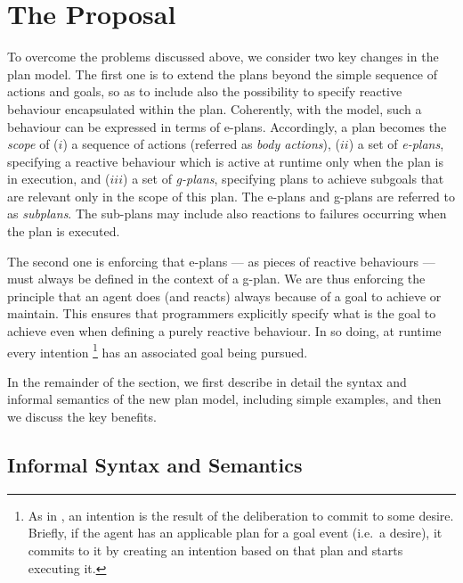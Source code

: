 \section{The {\aser} Proposal}
\label{sec:proposal}

To overcome the problems discussed above, we consider two key changes
in the plan model.
%
The first one is to extend the plans beyond the simple sequence of
actions and goals, so as to include also the possibility to specify
reactive behaviour encapsulated within the plan.
%
Coherently, with the {\asl} model, such a behaviour can be expressed
in terms of e-plans.
%
Accordingly, a plan becomes the \emph{scope} of ($i$) a sequence of
actions (referred as \emph{body actions}), ($ii$) a set of
\emph{e-plans}, specifying a reactive behaviour which is active at
runtime only when the plan is in execution, and ($iii$) a set of
\emph{g-plans}, specifying plans to achieve subgoals that are relevant
only in the scope of this plan. The e-plans and g-plans are referred
to as \emph{subplans}.
%
The sub-plans may include also reactions to failures occurring when
the plan is executed.

%
%
%
The second one is enforcing that e-plans --- as pieces of reactive
behaviours --- must always be defined in the context of a g-plan. We
are thus enforcing the principle that an agent does (and reacts)
always because of a goal to achieve or maintain.
%
This ensures that programmers explicitly specify what is the goal to
achieve even when defining a purely reactive behaviour.
%
In so doing, at runtime every intention \footnote{As in \asl, an
  intention is the result of the deliberation to commit to some
  desire. Briefly, if the agent has an applicable plan for a goal
  event (i.e.\ a desire), it commits to it by creating an intention
  based on that plan and starts executing it.} has an
associated goal being pursued.
%

In the remainder of the section, we first describe in detail the
syntax and informal semantics of the new plan model, including simple
examples, and then we discuss the key benefits.

\subsection{Informal Syntax and Semantics}

